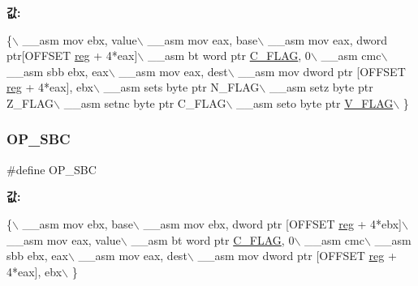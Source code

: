 {\bfseries 값\+:}
\begin{DoxyCode}
\{\(\backslash\)
        \_\_asm mov ebx, value\(\backslash\)
        \_\_asm mov eax, base\(\backslash\)
        \_\_asm mov eax, dword ptr[OFFSET \mbox{\hyperlink{_g_b_a_8h_ae29faba89509024ffd1a292badcedf2d}{reg}} + 4*eax]\(\backslash\)
        \_\_asm bt word ptr \mbox{\hyperlink{_g_b_8h_aa29c80f7f7f901ec7a2c57887f56585d}{C\_FLAG}}, 0\(\backslash\)
        \_\_asm cmc\(\backslash\)
        \_\_asm sbb ebx, eax\(\backslash\)
        \_\_asm mov eax, dest\(\backslash\)
        \_\_asm mov dword ptr [OFFSET \mbox{\hyperlink{_g_b_a_8h_ae29faba89509024ffd1a292badcedf2d}{reg}} + 4*eax], ebx\(\backslash\)
        \_\_asm sets byte ptr N\_FLAG\(\backslash\)
        \_\_asm setz byte ptr Z\_FLAG\(\backslash\)
        \_\_asm setnc byte ptr C\_FLAG\(\backslash\)
        \_\_asm seto byte ptr \mbox{\hyperlink{_g_b_a_8h_a11a0e7b14a93be5eb2720b0151900919}{V\_FLAG}}\(\backslash\)
      \}
\end{DoxyCode}
\mbox{\label{_g_b_a_8cpp_a3b83f784b191cd9fbd1dd80c8a9ec362}} 
\subsubsection{\texorpdfstring{O\+P\+\_\+\+S\+BC}{OP\_SBC}\hspace{0.1cm}{\footnotesize\ttfamily [1/2]}}
{\footnotesize\ttfamily \#define O\+P\+\_\+\+S\+BC}

{\bfseries 값\+:}
\begin{DoxyCode}
\{\(\backslash\)
        \_\_asm mov ebx, base\(\backslash\)
        \_\_asm mov ebx, dword ptr [OFFSET \mbox{\hyperlink{_g_b_a_8h_ae29faba89509024ffd1a292badcedf2d}{reg}} + 4*ebx]\(\backslash\)
        \_\_asm mov eax, value\(\backslash\)
        \_\_asm bt word ptr \mbox{\hyperlink{_g_b_8h_aa29c80f7f7f901ec7a2c57887f56585d}{C\_FLAG}}, 0\(\backslash\)
        \_\_asm cmc\(\backslash\)
        \_\_asm sbb ebx, eax\(\backslash\)
        \_\_asm mov eax, dest\(\backslash\)
        \_\_asm mov dword ptr [OFFSET \mbox{\hyperlink{_g_b_a_8h_ae29faba89509024ffd1a292badcedf2d}{reg}} + 4*eax], ebx\(\backslash\)
      \}
\end{DoxyCode}
\mbox{\label{arm-new_8h_a3b83f784b191cd9fbd1dd80c8a9ec362}} 
